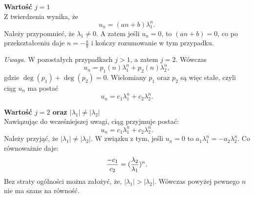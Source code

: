 \documentclass[leqno,10pt]{article}
\begin{document}
\textbf{Wartość $j=1$}\\
Z twierdzenia wynika, że
\[
u_n = (an+b) \lambda_1^n.
\]
Należy przypomnieć, że $\lambda_1 \neq 0$.
A zatem jeśli $u_n = 0$, to $(an+b) = 0$, co po przekształceniu daje $n = -\frac{a}{b}$ i kończy rozumowanie w tym przypadku.

\textit{Uwaga.}
W pozostałych przypadkach $j > 1$, a zatem $j = 2$. Wówczas
\[
u_n = p_1(n) \lambda_1^n + p_2(n) \lambda_2^n,
\]
gdzie $\deg(p_1) + \deg(p_2) = 0$. Wielomiany $p_1$ oraz $p_2$ są więc stałe, czyli ciąg $u_n$ ma postać
\[
u_n = c_1 \lambda_1^n + c_2 \lambda_2^n.
\]

\textbf{Wartość $j=2$ oraz $|\lambda_1| \neq |\lambda_2|$}\\
Nawiązując do wcześniejszej uwagi, ciąg przyjmuje postać:
\[
    u_n = c_1 \lambda_1^{n} + c_2 \lambda_{2}^n.
\]
Należy przyjąć, że $|\lambda_1| \neq |\lambda_2|$. W związku z tym, jeśli $u_n = 0$ to $a_1 \lambda_1^n = - a_2 \lambda_2^n$. Co równoważnie daje:
\[
    \frac{-c_1}{c_2} = (\large\frac{\lambda_2}{\lambda_1})^{n}.
\]
Bez straty ogólności można założyć, że, $|\lambda_1|>|\lambda_2|$. Wówczas powyżej pewnego $n$ nie ma szans na równość. 



 

\end{document}
